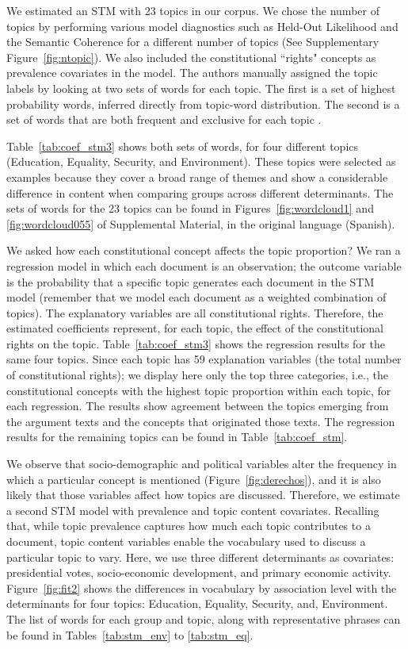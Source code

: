 \documentclass[onecolumn]{article}
\begin{document}
We estimated an STM with 23 topics in our corpus. We chose the number of topics by performing various model diagnostics such as Held-Out Likelihood and the Semantic Coherence for a different number of topics (See Supplementary Figure~\ref{fig:ntopic}). We also included the constitutional ``rights" concepts as prevalence covariates in the model. The authors manually assigned the topic labels by looking at two sets of words for each topic. The first is a set of highest probability words, inferred directly from topic-word distribution. The second is a set of words that are both frequent and exclusive for each topic \cite{bischof2012}. 

Table~\ref{tab:coef_stm3} shows both sets of words, for four different topics (Education, Equality, Security, and Environment). These topics were selected as examples because they cover a broad range of themes and show a considerable difference in content when comparing groups across different determinants. The sets of words for the 23 topics can be found in Figures~\ref{fig:wordcloud1} and \ref{fig:wordcloud055} of Supplemental Material, in the original language (Spanish). 



We asked how each constitutional concept affects the topic proportion? We ran a regression model in which each document is an observation; the outcome variable is the probability that a specific topic generates each document in the STM model (remember that we model each document as a weighted combination of topics). The explanatory variables are all constitutional rights. Therefore, the estimated coefficients represent, for each topic, the effect of the constitutional rights on the topic.  Table~\ref{tab:coef_stm3} shows the regression results for the same four topics. Since each topic has 59 explanation variables (the total number of constitutional rights); we display here only the top three categories, i.e., the constitutional concepts with the highest topic proportion within each topic, for each regression. The results show agreement between the topics emerging from the argument texts and the concepts that originated those texts. The regression results for the remaining topics can be found in Table~\ref{tab:coef_stm}.



We observe that socio-demographic and political variables alter the frequency in which a particular concept is mentioned (Figure~\ref{fig:derechos}), and it is also likely that those variables affect how topics are discussed. Therefore, we estimate a second STM model with prevalence and topic content covariates. Recalling that, while topic prevalence captures how much each topic contributes to a document, topic content variables enable the vocabulary used to discuss a particular topic to vary. Here, we use three different determinants as covariates: presidential votes, socio-economic development, and primary economic activity. Figure~\ref{fig:fit2} shows the differences in vocabulary by association level with the determinants for four topics: Education, Equality, Security, and, Environment. The list of words for each group and topic, along with representative phrases can be found in Tables~\ref{tab:stm_env} to \ref{tab:stm_eq}.
\end{document}
